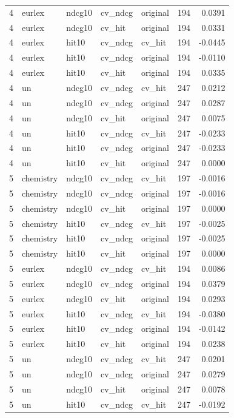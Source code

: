 \begin{tabular}{rllllrr}
4 & eurlex & ndcg10 & cv\_ndcg & original & 194 & 0.0391 \\
4 & eurlex & ndcg10 & cv\_hit & original & 194 & 0.0331 \\
4 & eurlex & hit10 & cv\_ndcg & cv\_hit & 194 & -0.0445 \\
4 & eurlex & hit10 & cv\_ndcg & original & 194 & -0.0110 \\
4 & eurlex & hit10 & cv\_hit & original & 194 & 0.0335 \\
4 & un & ndcg10 & cv\_ndcg & cv\_hit & 247 & 0.0212 \\
4 & un & ndcg10 & cv\_ndcg & original & 247 & 0.0287 \\
4 & un & ndcg10 & cv\_hit & original & 247 & 0.0075 \\
4 & un & hit10 & cv\_ndcg & cv\_hit & 247 & -0.0233 \\
4 & un & hit10 & cv\_ndcg & original & 247 & -0.0233 \\
4 & un & hit10 & cv\_hit & original & 247 & 0.0000 \\
5 & chemistry & ndcg10 & cv\_ndcg & cv\_hit & 197 & -0.0016 \\
5 & chemistry & ndcg10 & cv\_ndcg & original & 197 & -0.0016 \\
5 & chemistry & ndcg10 & cv\_hit & original & 197 & 0.0000 \\
5 & chemistry & hit10 & cv\_ndcg & cv\_hit & 197 & -0.0025 \\
5 & chemistry & hit10 & cv\_ndcg & original & 197 & -0.0025 \\
5 & chemistry & hit10 & cv\_hit & original & 197 & 0.0000 \\
5 & eurlex & ndcg10 & cv\_ndcg & cv\_hit & 194 & 0.0086 \\
5 & eurlex & ndcg10 & cv\_ndcg & original & 194 & 0.0379 \\
5 & eurlex & ndcg10 & cv\_hit & original & 194 & 0.0293 \\
5 & eurlex & hit10 & cv\_ndcg & cv\_hit & 194 & -0.0380 \\
5 & eurlex & hit10 & cv\_ndcg & original & 194 & -0.0142 \\
5 & eurlex & hit10 & cv\_hit & original & 194 & 0.0238 \\
5 & un & ndcg10 & cv\_ndcg & cv\_hit & 247 & 0.0201 \\
5 & un & ndcg10 & cv\_ndcg & original & 247 & 0.0279 \\
5 & un & ndcg10 & cv\_hit & original & 247 & 0.0078 \\
5 & un & hit10 & cv\_ndcg & cv\_hit & 247 & -0.0192 \\

\end{tabular}
